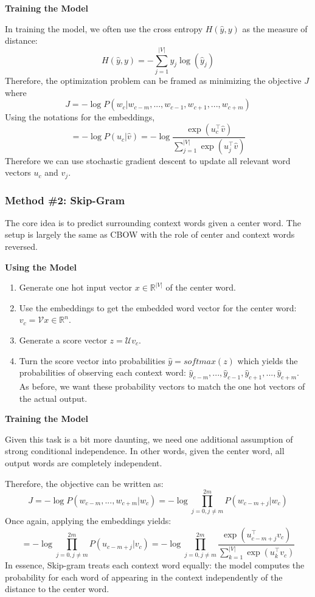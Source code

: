 \documentclass[
]{book}
\providecommand{\tightlist}{%
  \setlength{\itemsep}{0pt}\setlength{\parskip}{0pt}}
\begin{document}
\textbf{Training the Model}

In training the model, we often use the cross entropy \(H(\hat{y}, y)\) as the measure of distance:
\[
H(\hat{y}, y) = - \sum_{j=1}^{|V|} y_j \log (\hat{y}_j)
\]
Therefore, the optimization problem can be framed as minimizing the objective \(J\) where
\[
J = -\log P(w_c|w_{c-m}, ..., w_{c-1}, w_{c+1}, ..., w_{c+m})
\]
Using the notations for the embeddings,
\[
=-\log P(u_c|\hat{v}) = -\log \frac{\exp(u_c^\top \hat{v})}{\sum_{j=1}^{|V|} \exp(u_j^\top \hat{v})}
\]
Therefore we can use stochastic gradient descent to update all relevant word vectors \(u_c\) and \(v_j\).

\hypertarget{method-2-skip-gram}{%
\subsubsection{Method \#2: Skip-Gram}\label{method-2-skip-gram}}

The core idea is to predict surrounding context words given a center word. The setup is largely the same as CBOW with the role of center and context words reversed.

\textbf{Using the Model }

\begin{enumerate}
\def\labelenumi{\arabic{enumi}.}
\tightlist
\item
  Generate one hot input vector \(x\in\mathbb{R}^{|V|}\) of the center word.
\item
  Use the embeddings to get the embedded word vector for the center word: \(v_c = \mathcal{V}x\in \mathbb{R}^n\).
\item
  Generate a score vector \(z=\mathcal{U}v_c\).
\item
  Turn the score vector into probabilities \(\hat{y} = softmax(z)\) which yields the probabilities of observing each context word: \(\hat{y}_{c-m}, ..., \hat{y}_{c-1}, \hat{y}_{c+1}, ..., \hat{y}_{c+m}\). As before, we want these probability vectors to match the one hot vectors of the actual output.
\end{enumerate}

\textbf{Training the Model}

Given this task is a bit more daunting, we need one additional assumption of strong conditional independence. In other words, given the center word, all output words are completely independent.

Therefore, the objective can be written as:
\[
J = -\log P(w_{c-m}, ..., w_{c+m}|w_c) = -\log \prod_{j=0, j\neq m}^{2m} P(w_{c-m+j} | w_c)
\]
Once again, applying the embeddings yields:
\[
=-\log \prod_{j=0, j\neq m}^{2m} P(u_{c-m+j} | v_c) = -\log \prod_{j=0,j\neq m}^{2m} \frac{\exp(u_{c-m+j}^\top v_c)}{\sum_{k=1}^{|V|}\exp(u_{k}^\top v_c)}
\]
In essence, Skip-gram treats each context word equally: the model computes the probability for each word of appearing in the context independently of the distance to the center word.
\end{document}
